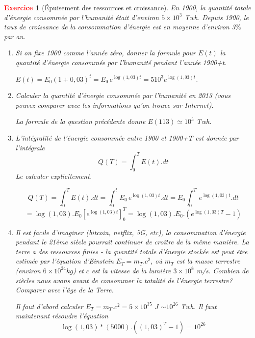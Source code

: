 \documentclass[11pt]{article}
\theoremstyle{mythmstyle}
\newtheorem{exo}{\textcolor{red}{\textbf{Exercice}}}
\begin{document}
\medskip


\begin{exo}[Épuisement des ressources et croissance]
En 1900, la quantité totale d'énergie consommée par l'humanité était d'environ $5 \times 10^3$ Twh. Depuis 1900, le taux de croissance de la consommation d’énergie est en moyenne d’environ 3$\%$ par an. 
\begin{enumerate}
\item Si on fixe 1900 comme l'année zéro, donner la formule pour $E(t)$ la quantité d'énergie consommée par l'humanité pendant l'année 1900+t.

\begin{solution}
$E(t)=E_0(1+0,03)^t= E_0\, e^{\log (1,03)t}= 5 10^3 e^{\log (1,03)t}$.
\end{solution}
   
\item Calculer la quantité d'énergie consommée par l'humanité en 2013 (vous pouvez comparer avec les informations qu'on trouve sur  Internet).

\begin{solution}
    La formule de la question précédente donne $E(113) \simeq 10^5$ Twh.
\end{solution}

   \item L'intégralité de l'énergie consommée entre 1900 et 1900+T est donnée par l'intégrale
     $$Q(T)= \int_{0}^T E(t).dt$$
     Le calculer explicitement.
     
\begin{solution}
     $$Q(T)= \int_{0}^T E(t).dt= \int_{0}^t E_0\, e^{\log (1,03)t}.dt=E_0 \int_{0}^T \, e^{\log (1,03)t}.dt $$
     $$
     = \log (1,03).E_0 [ e^{\log (1,03)t}]_{0}^{T}= \log (1,03).E_0.(e^{\log (1,03)T}-1)
     $$
\end{solution}

    \item  Il est facile d'imaginer (bitcoin, netflix, 5G, etc), la consommation d'énergie pendant le 21ème siècle pourrait continuer de croître de la même manière. La terre a des ressources finies - la quantité totale d'énergie stockée est peut être estimée par l'équation d'Einstein $E_T = m_T.c^2$, où $m_T$ est la masse terrestre (environ $6\times 10^{24} kg$) et $c$ est la vitesse de la lumière $3\times 10^8$ m/s. Combien de siècles nous avons avant de consommer la totalité de l'énergie terrestre? Comparer avec l'âge de la Terre.
    
\begin{solution}
    Il faut d'abord calculer $E_T=m_T. c^2= 5\times 10^{35}$ J $\sim 10^{26}$ Twh. Il faut maintenant résoudre l'équation
     $$
     \log (1,03)*(5000).((1,03)^T-1)=10^{26}
     $$
     

\end{solution}
\end{enumerate}
\end{exo}
\end{document}
